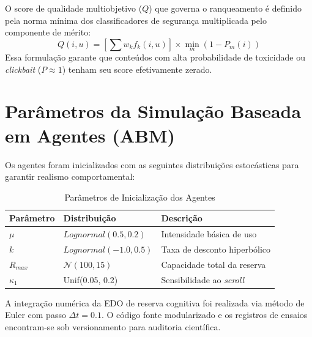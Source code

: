 O score de qualidade multiobjetivo ($Q$) que governa o ranqueamento é definido pela norma mínima dos classificadores de segurança multiplicada pelo componente de mérito:
\begin{equation}
Q(i, u) = \left[ \sum w_k f_k(i, u) \right] \times \min_m(1 - P_m(i))
\end{equation}
Essa formulação garante que conteúdos com alta probabilidade de toxicidade ou \textit{clickbait} ($P \approx 1$) tenham seu score efetivamente zerado.

\section{Parâmetros da Simulação Baseada em Agentes (ABM)}

Os agentes foram inicializados com as seguintes distribuições estocásticas para garantir realismo comportamental:
\begin{table}[H]
    \centering
    \caption{Parâmetros de Inicialização dos Agentes}
    \begin{tabular}{@{}lll@{}}
    \toprule
    Parâmetro & Distribuição & Descrição \\ \midrule
    $\mu$ & $Lognormal(0.5, 0.2)$ & Intensidade básica de uso \\
    $k$ & $Lognormal(-1.0, 0.5)$ & Taxa de desconto hiperbólico \\
    $R_{max}$ & $\mathcal{N}(100, 15)$ & Capacidade total da reserva \\
    $\kappa_1$ & Unif(0.05, 0.2) & Sensibilidade ao \textit{scroll} \\ \bottomrule
    \end{tabular}
\end{table}

A integração numérica da EDO de reserva cognitiva foi realizada via método de Euler com passo $\Delta t = 0.1$. O código fonte modularizado e os registros de ensaios encontram-se sob versionamento para auditoria científica.


